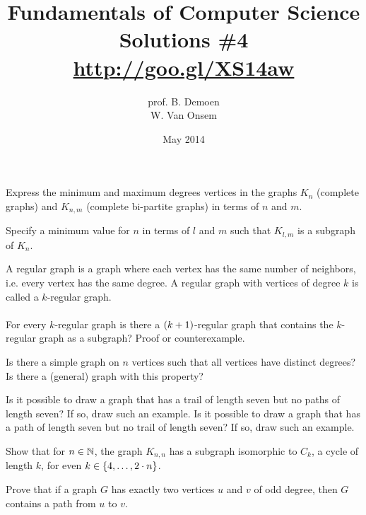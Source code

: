 \documentclass{article}
\title{Fundamentals of Computer Science\\Solutions \#4\\\url{http://goo.gl/XS14aw}}
\author{prof. B. Demoen\\W. Van Onsem}
\date{May 2014}
\begin{document}
\maketitle
\begin{exercise}
Express the minimum and maximum degrees vertices in the graphs $K_n$ (complete graphs) and $K_{n,m}$ (complete bi-partite graphs) in terms of $n$ and $m$.
\end{exercise}

\begin{exercise}
Specify a minimum value for $n$ in terms of $l$ and $m$ such that $K_{l,m}$ is a subgraph of $K_n$.
\end{exercise}

\begin{exercise}
A regular graph is a graph where each vertex has the same number of neighbors, i.e. every vertex has the same degree. A regular graph with vertices of degree $k$ is called a $k$-regular graph.
\paragraph{}
For every $k$-regular graph is there a $\left( k+1 \right)$-regular graph that contains the $k$-regular graph as a subgraph? Proof or counterexample.
\end{exercise}

\begin{exercise}
Is there a simple graph on $n$ vertices such that all vertices have distinct degrees? Is there a (general) graph with this property?
\end{exercise}

\begin{exercise}
Is it possible to draw a graph that has a trail of length seven but no paths of length seven? If so, draw such an example. Is it possible to draw a graph that has a path of length seven but no trail of length seven? If so, draw such an example.
\end{exercise}

\begin{exercise}
Show that for $n\in\mathbb{N}$, the graph $K_{n,n}$ has a subgraph isomorphic to $C_k$, a cycle of length $k$, for even $k\in\left\{ 4,\ldots,2\cdot n \right\}$.
\end{exercise}

\begin{exercise}
Prove that if a graph $G$ has exactly two vertices $u$ and $v$ of odd degree, then $G$ contains a path from $u$ to $v$.
\end{exercise}
\end{document}
